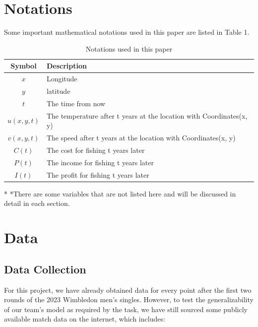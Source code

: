 \documentclass[12pt]{article}  %
\begin{document}
\section{Notations}
Some important mathematical notations used in this paper are listed in Table 1. 
\begin{table}[htbp]
\begin{center}
\caption{Notations used in this paper}
\begin{tabular}{c l}
\toprule[2pt]
\multicolumn{1}{m{3cm}}{\centering Symbol}
&\multicolumn{1}{m{8cm}}{\centering Description }\\
\midrule
$x$& Longitude \\
$y$& latitude \\
$t$& The time from now \\
$u(x,y,t)$& The temperature after t years at the location with Coordinates(x, y)\\
$v(x,y,t)$& The speed after t years at the location with Coordinates(x, y) \\
$C(t)$ & The cost for fishing t years later \\
$P(t)$ & The income for fishing t years later \\
$I(t)$ & The profit for fishing t years later \\
\bottomrule[2pt]
\end{tabular}\label{tb:notation}
 \begin{tablenotes}
        \footnotesize
        \item[*] *There are some variables that are not listed here and will be discussed in detail in each section. %
      \end{tablenotes}
\end{center}
\end{table}
\vspace{-1cm}%


\section{Data}
\subsection{Data Collection}
For this project, we have already obtained data for every point after the first two rounds of the 2023 Wimbledon men's singles. 
However, to test the generalizability of our team's model as required by the task, 
we have still sourced some publicly available match data on the internet, which includes:
\end{document}
